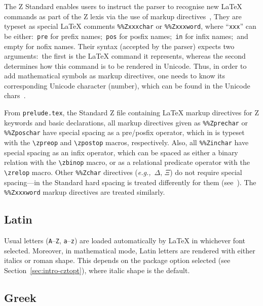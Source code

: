 \documentclass{article}
\newcommand{\emfile}[1]{\texttt{#1}}%
\newcommand{\preludefile}{\emfile{prelude.tex}}
\begin{document}
The Z Standard enables users to instruct the parser to recognise new \LaTeX{}
commands as part of the Z lexis via the use of markup directives~\cite[A.2.3]{isoz},
They are typeset as special \LaTeX{} comments \verb|%%Zxxxchar| or \verb|%%Zxxxword|,
where ``\verb|xxx|'' can be either:~\verb|pre| for prefix names;~\verb|pos| for
posfix names;~\verb|in| for infix names;~and empty for nofix names. Their syntax
(accepted by the parser) expects two arguments:~the first is the \LaTeX{} command
it represents, whereas the second determines how this command is to be rendered in Unicode.
Thus, in order to add mathematical symbols as markup directives, one needs to know its
corresponding Unicode character (number), which can be found in the Unicode chars~\cite{unicode}.

From \preludefile, the Standard Z file containing \LaTeX{} markup directives for
Z keywords and basic declarations, all markup directives given as \verb|%%Zprechar|
or \verb|%%Zposchar| have special spacing as a pre/posfix operator, which in \cztstylefile
is typeset with the \verb|\zpreop| and \verb|\zpostop| macros, respectively.
Also, all \verb|%%Zinchar| have special spacing as an infix operator, which can be
spaced as either a binary relation with the \verb|\zbinop| macro, or as a relational predicate
operator with the \verb|\zrelop| macro. Other \verb|%%Zchar| directives (\textit{e.g.,}~$\Delta$, $\Xi$)
do not require special spacing---in the Standard hard spacing is treated differently for them
(see~\cite[A.6.28.2]{isoz}). The \verb|%%Zxxxword| markup directives are treated similarly.

\subsection{Latin}\label{sec:letters-latin}

Usual letters (\texttt{A}--\texttt{Z}, \texttt{a}--\texttt{z}) are
loaded automatically by \LaTeX{} in whichever font selected.
Moreover, in mathematical mode, Latin letters are rendered with either
italics or roman shape. This depends on the package option selected
(see Section~\ref{sec:intro-cztopt}), where italic shape is the default.

\subsection{Greek}\label{sec:letters-greek}
\end{document}
